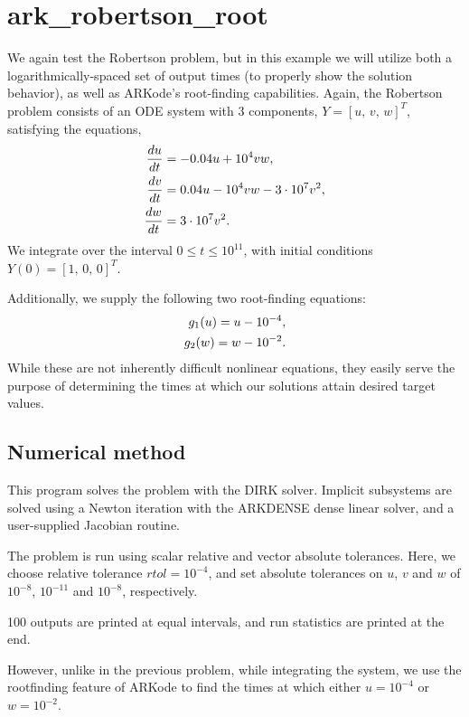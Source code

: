 \documentclass[letterpaper,10pt,english]{sphinxmanual}
\begin{document}
\section{ark\_robertson\_root}
\label{c_serial:ark-robertson-root}\label{c_serial:id13}
We again test the Robertson problem, but in this example we will
utilize both a logarithmically-spaced set of output times (to properly
show the solution behavior), as well as ARKode's root-finding
capabilities.  Again, the Robertson problem consists of an ODE system
with 3 components, $Y = [u,\, v,\, w]^T$, satisfying the equations,
\begin{gather}
\begin{split}\frac{du}{dt} &= -0.04 u + 10^4 v w, \\
\frac{dv}{dt} &= 0.04 u - 10^4 v w - 3\cdot10^7 v^2, \\
\frac{dw}{dt} &= 3\cdot10^7 v^2.\end{split}\notag
\end{gather}
We integrate over the interval $0\le t\le 10^{11}$, with initial
conditions  $Y(0) = [1,\, 0,\, 0]^T$.

Additionally, we supply the following two root-finding equations:
\begin{gather}
\begin{split}g_1(u) = u - 10^{-4}, \\
g_2(w) = w - 10^{-2}.\end{split}\notag
\end{gather}
While these are not inherently difficult nonlinear equations, they
easily serve the purpose of determining the times at which our
solutions attain desired target values.


\subsection{Numerical method}
\label{c_serial:id14}
This program solves the problem with the DIRK solver.  Implicit
subsystems are solved using a Newton iteration with the ARKDENSE dense
linear solver, and a user-supplied Jacobian routine.

The problem is run using scalar relative and vector absolute
tolerances.  Here, we choose relative tolerance $rtol=10^{-4}$,
and set absolute tolerances on $u$, $v$ and $w$ of
$10^{-8}$, $10^{-11}$ and $10^{-8}$, respectively.

100 outputs are printed at equal intervals, and run statistics are
printed at the end.

However, unlike in the previous problem, while integrating the system,
we use the rootfinding feature of ARKode to find the times at which
either $u=10^{-4}$ or $w=10^{-2}$.
\end{document}
